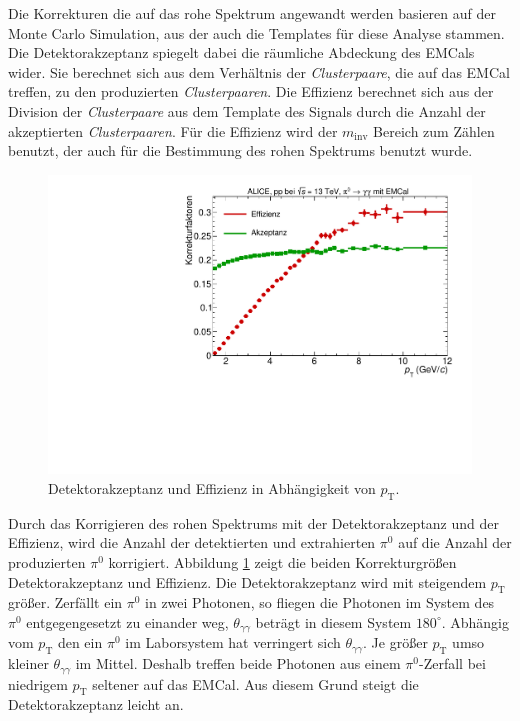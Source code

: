 Die Korrekturen die auf das rohe Spektrum angewandt werden basieren auf der Monte Carlo Simulation, aus der auch die Templates für diese Analyse stammen.
\newline
Die Detektorakzeptanz spiegelt dabei die räumliche Abdeckung des EMCals wider.
Sie berechnet sich aus dem Verhältnis der \textit{Clusterpaare}, die auf das EMCal treffen, zu den produzierten \textit{Clusterpaaren}.
\newline
Die Effizienz berechnet sich aus der Division der \textit{Clusterpaare} aus dem Template des Signals durch die Anzahl der akzeptierten \textit{Clusterpaaren}.
Für die Effizienz wird der $m_\text{inv}$ Bereich zum Zählen benutzt, der auch für die Bestimmung des rohen Spektrums benutzt wurde.
\begin{figure}[t] %
\centering
\includegraphics[width=.65\linewidth]{Korrekturfaktoren_Data_2016.pdf}
\caption{Detektorakzeptanz und Effizienz in Abhängigkeit von $p_\text{T}$.
}
\label{fig:Korrekturen}
\end{figure}
\newline
Durch das Korrigieren des rohen Spektrums mit der Detektorakzeptanz und der Effizienz, wird die Anzahl der detektierten und extrahierten $\pi^{0}$ auf die Anzahl der produzierten $\pi^{0}$ korrigiert.
Abbildung \ref{fig:Korrekturen} zeigt die beiden Korrekturgrößen Detektorakzeptanz und Effizienz.
\newline
Die Detektorakzeptanz wird mit steigendem $p_\text{T}$ größer.
Zerfällt ein $\pi^{0}$ in zwei Photonen, so fliegen die Photonen im System des $\pi^{0}$ entgegengesetzt zu einander weg, $\theta_{\gamma\gamma}$ beträgt in diesem System $180^{\circ}$.
Abhängig vom $p_\text{T}$ den ein $\pi^{0}$ im Laborsystem hat verringert sich $\theta_{\gamma\gamma}$.
Je größer $p_\text{T}$ umso kleiner $\theta_{\gamma\gamma}$ im Mittel.
Deshalb treffen beide Photonen aus einem $\pi^{0}$-Zerfall bei niedrigem $p_\text{T}$ seltener auf das EMCal.
Aus diesem Grund steigt die Detektorakzeptanz leicht an.
